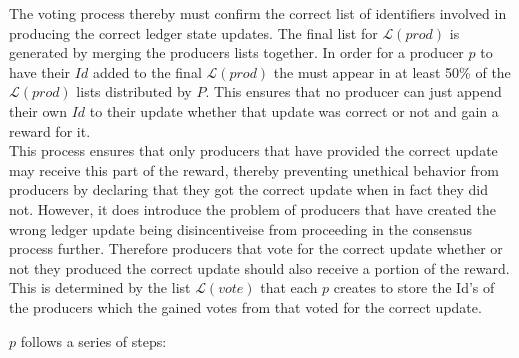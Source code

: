 The voting process thereby must confirm the correct list of identifiers involved in producing the correct ledger state updates. The final list for  $\mathcal{L}(prod)$ is generated by merging the producers lists together. In order for a producer $p$ to have their $Id$ added to the final  $\mathcal{L}(prod)$ the must appear in at least 50\% of the  $\mathcal{L}(prod)$ lists distributed by $P$. This ensures that no producer can just append their own $Id$ to their update whether that update was correct or not and gain a reward for it.  \\

This process ensures that only producers that have provided the correct update may receive this part of the reward, thereby preventing unethical behavior from producers by declaring that they got the correct update when in fact they did not. However, it does introduce the problem of producers that have created the wrong ledger update being disincentiveise from proceeding in the consensus process further. Therefore producers that vote for the correct update whether or not they produced the correct update should also receive a portion of the reward. This is determined by the list $\mathcal{L}(vote)$ that each $p$ creates to store the Id's of the producers which the gained votes from that voted for the correct update. 

$p$ follows a series of steps:

